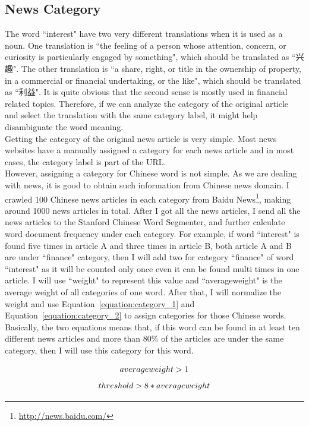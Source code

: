 \subsection{News Category}
The word ``interest" have two very different translations when it is used as a noun. One translation is ``the feeling of a person whose attention, concern, or curiosity is particularly engaged by something", which should be translated as ``兴趣". The other translation is ``a share, right, or title in the ownership of property, in a commercial or financial undertaking, or the like", which should be translated as ``利益". It is quite obvious that the second sense is mostly used in financial related topics. Therefore, if we can analyze the category of the original article and 
select the translation with the same category label, it might help disambiguate the word meaning.
\\
Getting the category of the original news article is very simple. Most news websites have a manually assigned a category for each news article and in most cases, the category label is part of the URL.
\\
However, assigning a category for Chinese word is not simple. As we are dealing with news, it is good to obtain such information from Chinese news domain. I crawled 100 Chinese news articles in each category from  Baidu News\footnote{\url{http://news.baidu.com/}}, making around 1000 news articles in total. After I got all the news articles, I send all the news articles to the Stanford Chinese Word Segmenter, and further calculate word document frequency under each  category. For example, if word ``interest" is found five times in article A and three times in article B, both article A and B are under ``finance" category, then I will add two for category ``finance" of word ``interest" as it will be counted only once even it can be found multi times in one article. I will use ``weight" to represent this value and ``averageweight" is the average weight of all categories of one word. After that, I will normalize the weight and use Equation~\ref{equation:category_1} and Equation~\ref{equation:category_2} to assign categories for those Chinese words. Basically, the two equations means that, if this word can be found in at least ten different news articles and more than 80\% of the articles are under the same category, then I will use this category for this word.

\begin{equation}
averageweight > 1\\
\label{equation:category_1}
\end{equation}
\begin{equation}
threshold > 8 * averageweight\\
\label{equation:category_2}
\end{equation}

